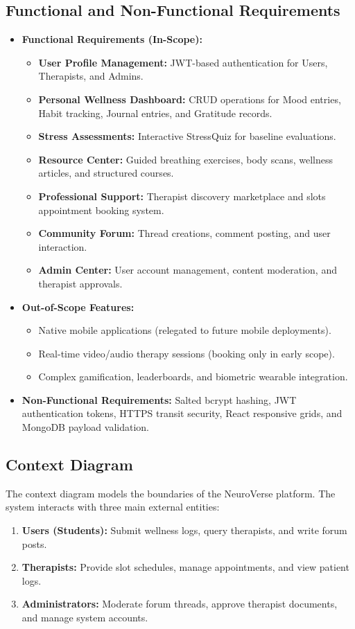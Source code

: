\documentclass[a4paper,11pt]{report}
\begin{document}
\subsection{Functional and Non-Functional Requirements}
\begin{itemize}
    \item \textbf{Functional Requirements (In-Scope):}
    \begin{itemize}
        \item \textbf{User Profile Management:} JWT-based authentication for Users, Therapists, and Admins.
        \item \textbf{Personal Wellness Dashboard:} CRUD operations for Mood entries, Habit tracking, Journal entries, and Gratitude records.
        \item \textbf{Stress Assessments:} Interactive StressQuiz for baseline evaluations.
        \item \textbf{Resource Center:} Guided breathing exercises, body scans, wellness articles, and structured courses.
        \item \textbf{Professional Support:} Therapist discovery marketplace and slots appointment booking system.
        \item \textbf{Community Forum:} Thread creations, comment posting, and user interaction.
        \item \textbf{Admin Center:} User account management, content moderation, and therapist approvals.
    \end{itemize}
    \item \textbf{Out-of-Scope Features:}
    \begin{itemize}
        \item Native mobile applications (relegated to future mobile deployments).
        \item Real-time video/audio therapy sessions (booking only in early scope).
        \item Complex gamification, leaderboards, and biometric wearable integration.
    \end{itemize}
    \item \textbf{Non-Functional Requirements:} Salted bcrypt hashing, JWT authentication tokens, HTTPS transit security, React responsive grids, and MongoDB payload validation.
\end{itemize}

\subsection{Context Diagram}
The context diagram models the boundaries of the NeuroVerse platform. The system interacts with three main external entities:
\begin{enumerate}
    \item \textbf{Users (Students):} Submit wellness logs, query therapists, and write forum posts.
    \item \textbf{Therapists:} Provide slot schedules, manage appointments, and view patient logs.
    \item \textbf{Administrators:} Moderate forum threads, approve therapist documents, and manage system accounts.
\end{enumerate}
\end{document}
